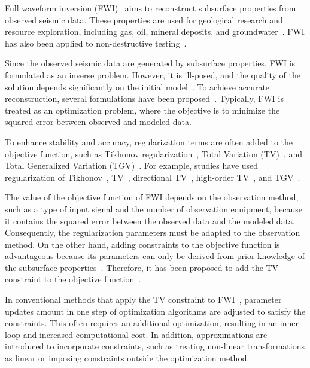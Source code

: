Full waveform inversion (FWI)~\cite{FWI0,FWI1} aims to reconstruct subsurface properties from observed seismic data.
These properties are used for geological research and resource exploration, including gas, oil, mineral deposits, and groundwater~\cite{FWI1,FWIApplicationGroundwater0,FWIApplicationGroundwater1}.
FWI has also been applied to non-destructive testing~\cite{FWIApplicationNonDestructiveTesting0,FWIApplicationNonDestructiveTesting1}.

Since the observed seismic data are generated by subsurface properties, FWI is formulated as an inverse problem.
However, it is ill-posed, and the quality of the solution depends significantly on the initial model~\cite{FWI1}.
To achieve accurate reconstruction, several formulations have been proposed~\cite{FWI0,CustomFWI0,CustomFWI1,CustomFWI2,CustomFWI3,CustomFWI4,CustomFWI5}.
Typically, FWI is treated as an optimization problem, where the objective is to minimize the squared error between observed and modeled data.

To enhance stability and accuracy, regularization terms are often added to the objective function, such as Tikhonov regularization~\cite{tikhonov}, Total Variation (TV)~\cite{TV}, and Total Generalized Variation (TGV)~\cite{TGV}.
For example, studies have used regularization of Tikhonov~\cite{FWI-with-tikhonov-regularization}, TV~\cite{FWI-with-TV-regularization}, directional TV~\cite{FWI-with-directional-TV-regularization}, high-order TV~\cite{FWI-with-high-order-TV-regularization}, and TGV~\cite{FWI-with-TGV-regularization}.

The value of the objective function of FWI depends on the observation method, such as a type of input signal and the number of observation equipment, because it contains the squared error between the observed data and the modeled data.
Consequently, the regularization parameters must be adapted to the observation method.
On the other hand, adding constraints to the objective function is advantageous because its parameters can only be derived from prior knowledge of the subsurface properties~\cite{constraints-vs-penalties-in-FWI}.
Therefore, it has been proposed to add the TV constraint to the objective function~\cite{FWI-with-TV-constraint,FWI-with-TV-constraint2,FWI-with-TV-constraint3}.

In conventional methods that apply the TV constraint to FWI~\cite{FWI-with-TV-constraint,FWI-with-TV-constraint2}, parameter updates amount in one step of optimization algorithms are adjusted to satisfy the constraints.
This often requires an additional optimization, resulting in an inner loop and increased computational cost.
In addition, approximations are introduced to incorporate constraints, such as treating non-linear transformations as linear or imposing constraints outside the optimization method.

